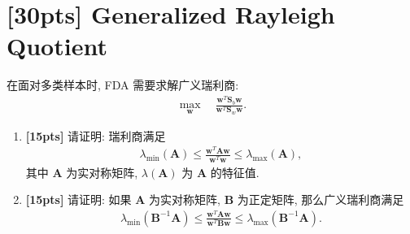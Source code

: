 \documentclass[a4paper,UTF8]{article}
\theoremstyle{definition}
\begin{document}
\section{[30pts] Generalized Rayleigh Quotient}
在面对多类样本时, FDA 需要求解广义瑞利商:
\begin{align}
	\label{fda}
	\max_{\bm{w}}\quad\frac{\bm{w}^T\bm{S}_b\bm{w}}{\bm{w}^T\bm{S}_w\bm{w}}.
\end{align}
\begin{enumerate}[(1)]
	\item \textbf{[15pts]} 请证明: 瑞利商满足
	      \begin{align}
		      \lambda_{\text{min}}(\bm{A})\le \frac{\bm{w}^T\bm{A}\bm{w}}{\bm{w}^T\bm{w}}\le \lambda_{\text{max}}(\bm{A}),
	      \end{align}
	      其中 $\bm{A}$ 为实对称矩阵, $\lambda(\bm{A})$ 为 $\bm{A}$ 的特征值.
	\item \textbf{[15pts]} 请证明: 如果 $\bm{A}$ 为实对称矩阵, $\bm{B}$ 为正定矩阵, 那么广义瑞利商满足
	      \begin{align}
		      \lambda_{\text{min}}(\bm{B}^{-1}\bm{A})\le \frac{\bm{w}^T\bm{A}\bm{w}}{\bm{w}^T\bm{B}\bm{w}}\le \lambda_{\text{max}}(\bm{B}^{-1}\bm{A}).
	      \end{align}
\end{enumerate}
\end{document}
